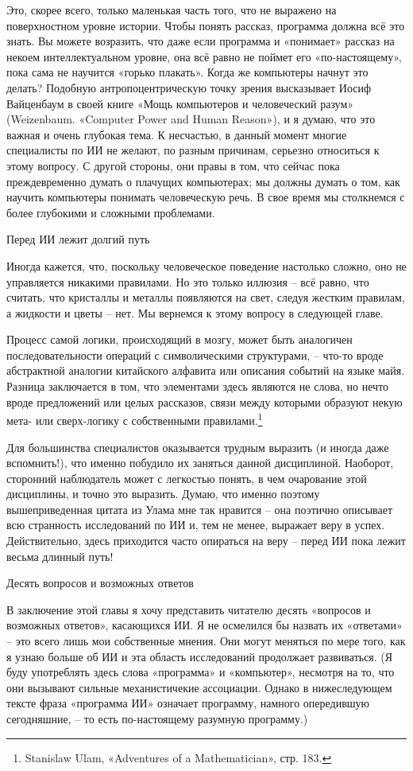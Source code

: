 \documentclass[../main.tex]{subfiles}
\begin{document}
Это, скорее всего, только маленькая часть того, что не выражено на поверхностном уровне истории. Чтобы понять рассказ, программа должна всё это знать. Вы можете возразить, что даже если программа и «понимает» рассказ на некоем интеллектуальном уровне, она всё равно не поймет его «по-настоящему», пока сама не научится «горько плакать». Когда же компьютеры начнут это делать? Подобную антропоцентрическую точку зрения высказывает Иосиф Вайценбаум в своей книге «Мощь компьютеров и человеческий разум» (Weizenbaum. «Computer Power and Human Reason»), и я думаю, что это важная и очень глубокая тема. К несчастью, в данный момент многие специалисты по ИИ не желают, по разным причинам, серьезно относиться к этому вопросу. С другой стороны, они правы в том, что сейчас пока преждевременно думать о плачущих компьютерах; мы должны думать о том, как научить компьютеры понимать человеческую речь. В свое время мы столкнемся с более глубокими и сложными проблемами.

Перед ИИ лежит долгий путь

Иногда кажется, что, поскольку человеческое поведение настолько сложно, оно не управляется никакими правилами. Но это только иллюзия \--- всё равно, что считать, что кристаллы и металлы появляются на свет, следуя жестким правилам, а жидкости и цветы \--- нет. Мы вернемся к этому вопросу в следующей главе.

Процесс самой логики, происходящий в мозгу, может быть аналогичен последовательности операций с символическими структурами, \--- что-то вроде абстрактной аналогии китайского алфавита или описания событий на языке майя. Разница заключается в том, что элементами здесь являются не слова, но нечто вроде предложений или целых рассказов, связи между которыми образуют некую мета- или сверх-логику с собственными правилами.\footnote{Stanislaw Ulam, «Adventures of a Mathematician», стр. 183.}

Для большинства специалистов оказывается трудным выразить (и иногда даже вспомнить!), что именно побудило их заняться данной дисциплиной. Наоборот, сторонний наблюдатель может с легкостью понять, в чем очарование этой дисциплины, и точно это выразить. Думаю, что именно поэтому вышеприведенная цитата из Улама мне так нравится \--- она поэтично описывает всю странность исследований по ИИ и, тем не менее, выражает веру в успех. Действительно, здесь приходится часто опираться на веру \--- перед ИИ пока лежит весьма длинный путь!

Десять вопросов и возможных ответов

В заключение этой главы я хочу представить читателю десять «вопросов и возможных ответов», касающихся ИИ\@. Я не осмелился бы назвать их «ответами» \--- это всего лишь мои собственные мнения. Они могут меняться по мере того, как я узнаю больше об ИИ и эта область исследований продолжает развиваться. (Я буду употреблять здесь слова «программа» и «компьютер», несмотря на то, что они вызывают сильные механистичекие ассоциации. Однако в нижеследующем тексте фраза «программа ИИ» означает программу, намного опередившую сегодняшние, \--- то есть по-настоящему разумную программу.)
\end{document}
